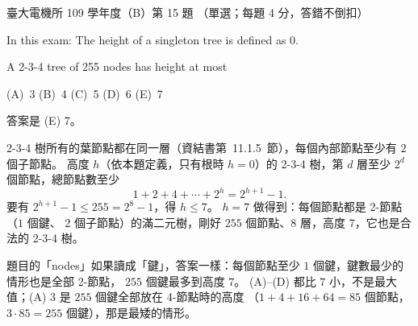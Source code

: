 \begin{pastexam}[label={px:ntu-109-ee-ds-15}]{臺大電機所 109 學年度（B）第 15 題}
（單選；每題 4 分，答錯不倒扣）

In this exam: The height of a singleton tree is defined as 0.

A 2-3-4 tree of 255 nodes has height at most

(A)~3 \qquad (B)~4 \qquad (C)~5 \qquad (D)~6 \qquad (E)~7
\end{pastexam}

\begin{pastsoln}
答案是 (E) 7。

2-3-4 樹所有的葉節點都在同一層（資結書第~11.1.5~節），每個內部節點至少有 $2$ 個子節點。 高度
$h$（依本題定義，只有根時 $h = 0$）的 2-3-4 樹，第 $d$ 層至少 $2^d$ 個節點，總節點數至少
\[
1 + 2 + 4 + \cdots + 2^h = 2^{h+1} - 1 .
\]
要有 $2^{h+1} - 1 \le 255 = 2^8 - 1$，得 $h \le 7$。 $h = 7$ 做得到：每個節點都是 2-節點（$1$ 個鍵、
$2$ 個子節點）的滿二元樹，剛好 $255$ 個節點、$8$ 層，高度 $7$，它也是合法的 2-3-4 樹。

題目的「nodes」如果讀成「鍵」，答案一樣：每個節點至少 $1$ 個鍵，鍵數最少的情形也是全部 2-節點，
$255$ 個鍵最多到高度 $7$。 (A)--(D) 都比 $7$ 小，不是最大值；(A) 3 是 $255$ 個鍵全部放在 4-節點時的高度
（$1 + 4 + 16 + 64 = 85$ 個節點，$3 \cdot 85 = 255$ 個鍵），那是最矮的情形。
\end{pastsoln}
